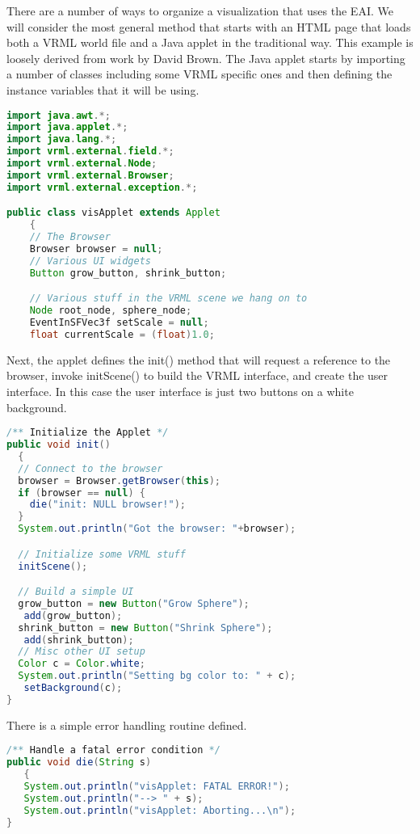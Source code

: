 There are a number of ways to organize a visualization that uses the EAI. We will consider the most general method that starts with an HTML page that loads both a VRML world file and a Java applet in the traditional way. This example is loosely derived from work by David Brown. The Java applet starts by importing a number of classes including some VRML specific ones and then defining the instance variables that it will be using.

\begin{lstlisting}[language=Java, caption={}, numbers=none, frame=none]
import java.awt.*;
import java.applet.*;
import java.lang.*;
import vrml.external.field.*;
import vrml.external.Node;
import vrml.external.Browser;
import vrml.external.exception.*;

public class visApplet extends Applet
    {
    // The Browser
    Browser browser = null;
    // Various UI widgets
    Button grow_button, shrink_button;

    // Various stuff in the VRML scene we hang on to
    Node root_node, sphere_node;
    EventInSFVec3f setScale = null;
    float currentScale = (float)1.0;
\end{lstlisting}

Next, the applet defines the init() method that will request a reference to the browser, invoke initScene() to build the VRML interface, and create the user interface. In this case the user interface is just two buttons on a white background.

\begin{lstlisting}[language=Java, caption={}, numbers=none, frame=none]
/** Initialize the Applet */
public void init()
  {
  // Connect to the browser
  browser = Browser.getBrowser(this);
  if (browser == null) {
    die("init: NULL browser!");
  }
  System.out.println("Got the browser: "+browser);

  // Initialize some VRML stuff
  initScene();

  // Build a simple UI
  grow_button = new Button("Grow Sphere");
   add(grow_button);
  shrink_button = new Button("Shrink Sphere");
   add(shrink_button);
  // Misc other UI setup
  Color c = Color.white;
  System.out.println("Setting bg color to: " + c);
   setBackground(c);
}
\end{lstlisting}

There is a simple error handling routine defined.

\begin{lstlisting}[language=Java, caption={}, numbers=none, frame=none]
/** Handle a fatal error condition */
public void die(String s)
   {
   System.out.println("visApplet: FATAL ERROR!");
   System.out.println("--> " + s);
   System.out.println("visApplet: Aborting...\n");
}
\end{lstlisting}

